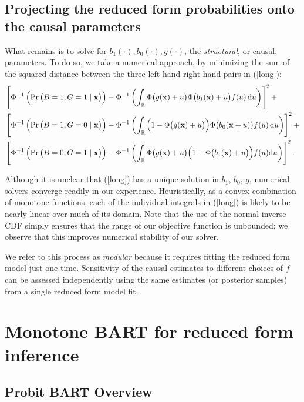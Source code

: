 \documentclass[aoas,preprint, 11pt, dvipsnames, table, x11name]{imsart}
\renewcommand{\bm}[1]{\mathbf{#1}}
\theoremstyle{remark}
\begin{document}
	\subsection{Projecting the reduced form probabilities onto the causal parameters}
	
	What remains is to solve for $b_1(\cdot),b_0(\cdot), g(\cdot)$, the {\em structural}, or causal, parameters. To do so, we take a numerical approach, by minimizing  the sum of the squared distance between the three left-hand right-hand pairs in (\ref{long}):
	\begin{align*}
		&\left[\Phi^{-1}\left(\Pr\qty(B=1, G=1\mid \mathbf{x})\right)-\Phi^{-1}\left(\int_{\mathbb{R}} \Phi\qty(g(\mathbf{x})+u)\Phi\qty(b_1(\mathbf{x})+u)f(u)\dd{u}\right)\right]^2+\\
		&\left[\Phi^{-1}\left(\Pr\qty(B=1, G=0\mid \mathbf{x})\right)-\Phi^{-1}\left(\int_{\mathbb{R}} \qty(1-\Phi\qty(g(\bm{x})+u))\Phi\qty(b_0(\bm{x}+u))f(u)\dd{u}\right)\right]^2+\\
		&\left[\Phi^{-1}\left(\Pr\qty(B=0, G=1\mid \mathbf{x})\right)-\Phi^{-1}\left(\int_{\mathbb{R}}\Phi\qty(g(\bm{x})+u)\qty(1-\Phi\qty(b_1(\bm{x})+u))f(u)\dd u\right)\right]^2.
	\end{align*}
	
	Although it is unclear that (\ref{long}) has a unique solution in $b_1$, $b_0$, $g$, numerical solvers converge readily in our experience. Heuristically, as a convex combination of monotone functions, each of the individual integrals in (\ref{long}) is likely to be nearly linear over much of its domain. Note that the use of the normal inverse CDF simply ensures that the range of our objective function is unbounded; we observe that this improves numerical stability of our solver.
	
	We refer to this process as {\em modular} because it requires fitting the reduced form model just one time. Sensitivity of the causal estimates to different choices of $f$ can be assessed independently using the same estimates (or posterior samples) from a single reduced form model fit.
	
	\section{Monotone BART for reduced form inference}
	
	\subsection{Probit BART Overview}
	
\end{document}
